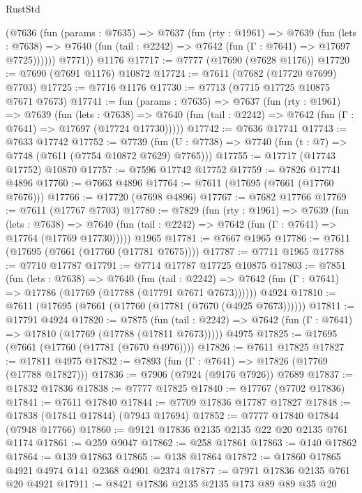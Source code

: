 \begin{lexlean}{RustStd}
\begin{coremodule}
{\begin{coremodule}
{{{{{{{{{{{{{{{{{{{{{{{{{{{{{{{{{{        (@7636
          (fun (params : @7635) =>
          @7637
            (fun (rty : @1961) =>
            @7639
              (fun (lets : @7638) =>
              @7640 (fun (tail : @2242) => @7642 (fun (Γ : @7641) => @17697 @7725))))))
        @7771))
    @1176
@17717 := @7777 (@17690 (@7628 @1176))
@17720 := @7690 (@7691 @1176) @10872
@17724 := @7611 (@7682 (@17720 @7699) @7703)
@17725 := @7716 @1176
@17730 := @7713 (@7715 @17725 @10875 @7671 @7673)
@17741 := fun (params : @7635) =>
  @7637
    (fun (rty : @1961) =>
    @7639
      (fun (lets : @7638) =>
      @7640 (fun (tail : @2242) => @7642 (fun (Γ : @7641) => @17697 (@17724 @17730)))))
@17742 := @7636 @17741
@17743 := @7633 @17742
@17752 := @7739
    (fun (U : @7738) => @7740 (fun (t : @7) => @7748 (@7611 (@7754 @10872 @7629) @7765)))
@17755 := @17717 (@17743 @17752) @10870
@17757 := @7596 @17742 @17752
@17759 := @7826 @17741 @4896
@17760 := @7663 @4896
@17764 := @7611 (@17695 (@7661 (@17760 @7676)))
@17766 := @17720 (@7698 @4896)
@17767 := @7682 @17766
@17769 := @7611 (@17767 @7703)
@17780 := @7829
    (fun (rty : @1961) =>
    @7639
      (fun (lets : @7638) =>
      @7640 (fun (tail : @2242) => @7642 (fun (Γ : @7641) => @17764 (@17769 @17730)))))
    @1965
@17781 := @7667 @1965
@17786 := @7611 (@17695 (@7661 (@17760 (@17781 @7675))))
@17787 := @7711 @1965
@17788 := @7710 @17787
@17791 := @7714 @17787 @17725 @10875
@17803 := @7851
    (fun (lets : @7638) =>
    @7640
      (fun (tail : @2242) =>
      @7642 (fun (Γ : @7641) => @17786 (@17769 (@17788 (@17791 @7671 @7673))))))
    @4924
@17810 := @7611 (@17695 (@7661 (@17760 (@17781 (@7670 (@4925 @7673))))))
@17811 := @17791 @4924
@17820 := @7875
    (fun (tail : @2242) => @7642 (fun (Γ : @7641) => @17810 (@17769 (@17788 (@17811 @7673)))))
    @4975
@17825 := @17695 (@7661 (@17760 (@17781 (@7670 @4976))))
@17826 := @7611 @17825
@17827 := @17811 @4975
@17832 := @7893 (fun (Γ : @7641) => @17826 (@17769 (@17788 @17827)))
@17836 := @7906 (@7924 (@9176 @7926)) @7689
@17837 := @17832 @17836
@17838 := @7777 @17825
@17840 := @17767 (@7702 @17836)
@17841 := @7611 @17840
@17844 := @7709 @17836 @17787 @17827
@17848 := @17838 (@17841 @17844) (@7943 @17694)
@17852 := @7777 @17840 @17844 (@7948 @17766)
@17860 := @9121 @17836 @2135 @2135 @22 @20 @2135 @761 @1174
@17861 := @259 @9047
@17862 := @258 @17861
@17863 := @140 @17862
@17864 := @139 @17863
@17865 := @138 @17864
@17872 := @17860 @17865 @4921 @4974 @141 @2368 @4901 @2374
@17877 := @7971 @17836 @2135 @761 @20 @4921
@17911 := @8421
    @17836
    @2135
    @2135
    @173
    @89
    @89
    @35
    @20
}}}}}}}}}}}}}}}}}}}}}}}}}}}}}}}}}}
\end{coremodule}}
\end{coremodule}
\end{lexlean}
